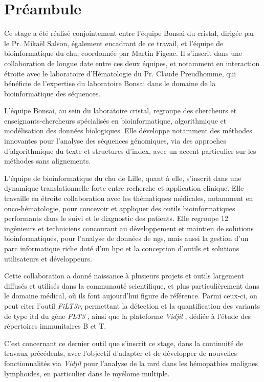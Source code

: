 \chapter{Préambule}

Ce stage a été réalisé conjointement entre l'équipe Bonsai du \gls{cristal}, 
dirigée par le Pr. Mikaël Salson, également encadrant de ce travail, 
et l'équipe de bioinformatique du \gls{chu}, coordonnée par Martin Figeac. 
Il s'inscrit dans une collaboration de longue date entre ces deux équipes, 
et notamment en interaction étroite avec le laboratoire d'Hématologie du Pr. Claude Preudhomme, 
qui bénéficie de l'expertise du laboratoire Bonsai dans le domaine de la bioinformatique 
des séquences.

\vspace{1em}

L'équipe Bonsai, au sein du laboratoire \gls{cristal}, regroupe des chercheurs et enseignants-chercheurs
spécialisés en bioinformatique, algorithmique et modélisation des données biologiques. 
Elle développe notamment des méthodes innovantes pour l'analyse des séquences génomiques, 
via des approches d'algorithmique du texte et structures d'index, avec un accent particulier 
sur les méthodes sans alignements. 

\vspace{1em}

L'équipe de bioinformatique du \gls{chu} de Lille, quant à elle, 
s'inscrit dans une dynamique translationnelle forte entre recherche et application clinique. 
Elle travaille en étroite collaboration avec les thématiques médicales, notamment en onco-hématologie, 
pour concevoir et appliquer des outils bioinformatiques performants dans le suivi et le diagnostic des patients.
Elle regroupe 12 ingénieurs et techniciens concourant au développement et maintien de solutions bioinformatiques,
pour l'analyse de données de \gls{ngs}, mais aussi la gestion d'un parc informatique riche doté 
d'un \gls{hpc} et la conception d'outils et solutions utilisateurs et développeurs.

\vspace{1em}

Cette collaboration a donné naissance à plusieurs projets et outils 
largement diffusés et utilisés dans la communauté scientifique, 
et plus particulièrement dans le domaine médical, où ils font aujourd'hui figure de référence. 
Parmi ceux-ci, on peut citer l'outil \textit{FiLT3r}, permettant la détection 
et la quantification des variants de type \gls{itd} du gène \textit{FLT3} \cite{boudryFrugalAlignmentfreeIdentification2022}, 
ainsi que la plateforme \textit{Vidjil} \cite{duezVidjilWebPlatform2016}, dédiée à l'étude des répertoires immunitaires B et T.

\vspace{1em}

C'est concernant ce dernier outil que s'inscrit ce stage, dans la continuité de travaux précédents,
avec l'objectif d'adapter et de développer de nouvelles fonctionnalités via \textit{Vidjil} 
pour l'analyse de la \gls{mrd} dans les hémopathies malignes lymphoïdes, en particulier dans le myélome multiple.